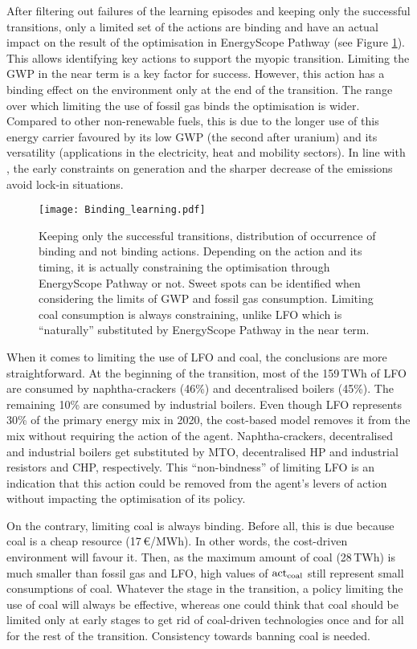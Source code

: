After filtering out failures of the learning episodes and keeping only the successful transitions, only a limited set of the actions are binding and have an actual impact on the result of the optimisation in EnergyScope Pathway (see Figure \ref{fig:Binding_learning}). This allows identifying key actions to support the myopic transition. Limiting the \gls{GWP} in the near term is a key factor for success. However, this action has a binding effect on the environment only at the end of the transition. The range over which limiting the use of fossil gas binds the optimisation is wider. Compared to other non-renewable fuels, this is due to the longer use of this energy carrier favoured by its low \gls{GWP} (the second after uranium) and its versatility (applications in the electricity, heat and mobility sectors). In line with \citet{vogt2018starting}, the early constraints on generation and the sharper decrease of the emissions avoid lock-in situations.

\begin{figure}[!htbp]
\centering
\texttt{[image: Binding\_learning.pdf]}
\caption{Keeping only the successful transitions, distribution of occurrence of binding and not binding actions. Depending on the action and its timing, it is actually constraining the optimisation through EnergyScope Pathway or not. Sweet spots can be identified when considering the limits of \gls{GWP} and fossil gas consumption. Limiting coal consumption is always constraining, unlike \gls{LFO} which is ``naturally'' substituted by EnergyScope Pathway in the near term.}
\label{fig:Binding_learning}
\end{figure}

When it comes to limiting the use of \gls{LFO} and coal, the conclusions are more straightforward. At the beginning of the transition, most of the 159\,TWh of \gls{LFO} are consumed by naphtha-crackers (46\%) and decentralised boilers (45\%). The remaining 10\% are consumed by industrial boilers. Even though \gls{LFO} represents  30\% of the primary energy mix in 2020, the cost-based model removes it from the mix without requiring the action of the agent. Naphtha-crackers, decentralised and industrial boilers get substituted by \gls{MTO}, decentralised \gls{HP} and industrial resistors and \gls{CHP}, respectively.  This ``non-bindness'' of limiting \gls{LFO} is an indication that this action could be removed from the agent's levers of action without impacting the optimisation of its policy.

On the contrary, limiting coal is always binding. Before all, this is due because coal is a cheap resource (17\,€/MWh). In other words, the cost-driven environment will favour it. Then, as the maximum amount of coal (28\,TWh) is much smaller than fossil gas and \gls{LFO}, high values of $\mathrm{act}\textsubscript{coal}$ still represent small consumptions of coal. Whatever the stage in the transition, a policy limiting the use of coal will always be effective, whereas one could think that coal should be limited only at early stages to get rid of coal-driven technologies once and for all for the rest of the transition. Consistency towards banning coal is needed.

